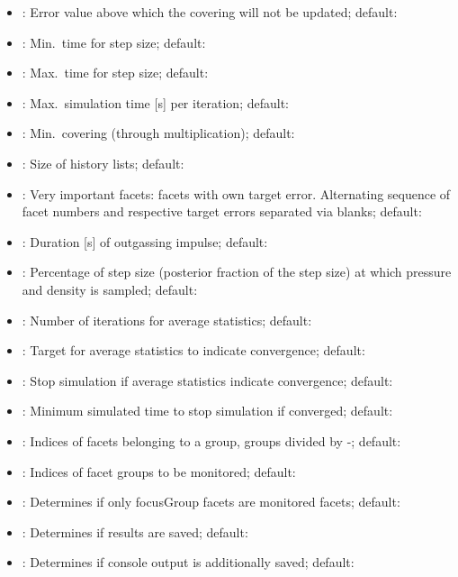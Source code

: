 \begin{itemize}[noitemsep,topsep=0pt, partopsep=0pt]
\item {}: Error value above which the covering will not be updated; default:
\item {}: Min.\ time for step size; default:
\item {}: Max.\ time for step size; default:
\item {}: Max.\ simulation time [s] per iteration; default:
\item {}: Min.\ covering (through multiplication); default:
\item {}: Size of history lists; default:
\item {}: Very important facets: facets with own target error. Alternating sequence of facet numbers and respective target errors separated via blanks; default:\codew{[]}
\item {}: Duration [s] of outgassing impulse; default: 
\item {}: Percentage of step size (posterior fraction of the step size) at which pressure and density is sampled; default: 
\item {}: Number of iterations for average statistics; default: 
\item {}: Target for average statistics to indicate convergence; default: 
\item {}: Stop simulation if average statistics indicate convergence; default: 
\item {}: Minimum simulated time to stop simulation if converged; default: 
\item {}:  Indices of facets belonging to a group, groups divided by -; default:\codew{[]}
\item {}: Indices of facet groups to be monitored; default:\codew{[]}
\item {}: Determines if only focusGroup facets are monitored facets; default:
\item {}: Determines if results are saved; default:
\item {}: Determines if console output is additionally saved; default:
\end{itemize}

